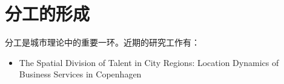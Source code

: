 \chapter{分工的形成}

分工是城市理论中的重要一环。近期的研究工作有：

\begin{itemize}
    \item  The Spatial Division of Talent in City Regions: Location Dynamics of Business Services in Copenhagen
\end{itemize}